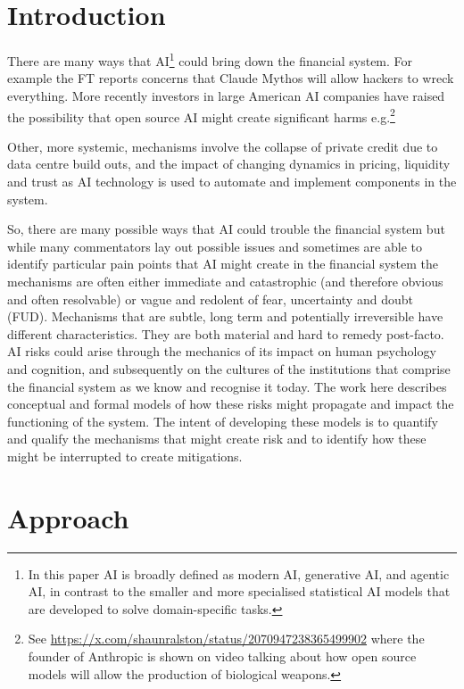 \documentclass[11pt]{article}
\begin{document}
\section{Introduction} \label{sec:introduction}

There are many ways that AI\footnote{In this paper AI is broadly defined as modern AI, generative AI, and agentic AI, in contrast to the smaller and more specialised statistical AI models that are developed to solve domain-specific tasks.} could bring down the financial system. For example the FT reports concerns that Claude Mythos will allow hackers to wreck everything. More recently investors in large American AI companies have raised the possibility that open source AI might create significant harms e.g.\footnote{See \url{https://x.com/shaunralston/status/2070947238365499902} where the founder of Anthropic is shown on video talking about how open source models will allow the production of biological weapons.} 

Other, more systemic, mechanisms involve the collapse of private credit due to data centre build outs, and the impact of changing dynamics in pricing, liquidity and trust as AI technology is used to automate and implement components in the system. 

So, there are many possible ways that AI could trouble the financial system but while many commentators lay out possible issues and sometimes are able to identify particular pain points that AI might create in the financial system the mechanisms are often either immediate and catastrophic (and therefore obvious and often resolvable) or vague and redolent of fear, uncertainty and doubt (FUD). Mechanisms that are subtle, long term and potentially irreversible have different characteristics. They are both material and hard to remedy post-facto. AI risks could arise through the mechanics of its impact on human psychology and cognition, and subsequently on the cultures of the institutions that comprise the financial system as we know and recognise it today. The work here describes conceptual and formal models of how these risks might propagate and impact the functioning of the system. The intent of developing these models is to quantify and qualify the mechanisms that might create risk and to identify how these  might be interrupted to create mitigations. 

\section{Approach}\label{sec:approach}
\end{document}

